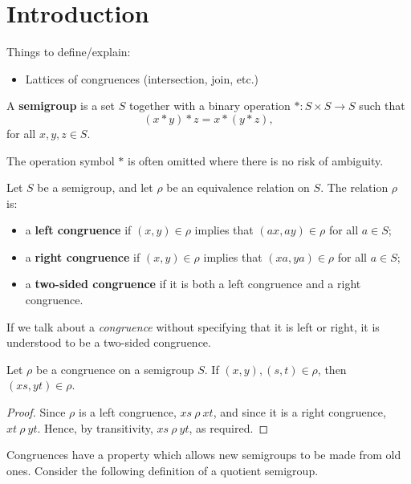 \chapter{Introduction}
\label{chap:intro}

Things to define/explain:

\begin{itemize}
\item Lattices of congruences (intersection, join, etc.)
\end{itemize}

\begin{definition}
  \label{def:semigroup}
  A \textbf{semigroup} is a set $S$ together with
  a binary operation $*: S \times S \to S$ such that
  $$(x * y) * z = x * (y * z),$$
  for all $x, y, z \in S$.
\end{definition}
The operation symbol $*$ is often omitted where there is no risk of ambiguity.

\begin{definition}
  \label{def:congruence}
  Let $S$ be a semigroup, and let $\rho$ be an equivalence relation on $S$.  The
  relation $\rho$ is:
  \begin{itemize}
  \item a \textbf{left congruence} if $(x, y) \in \rho$ implies that
    $(ax, ay) \in \rho$ for all $a \in S$;
  \item a \textbf{right congruence} if $(x, y) \in \rho$ implies that
    $(xa, ya) \in \rho$ for all $a \in S$;
  \item a \textbf{two-sided congruence} if it is both a left congruence and a
    right congruence.
  \end{itemize}
\end{definition}

If we talk about a \textit{congruence} without specifying that it is left or
right, it is understood to be a two-sided congruence.

\begin{proposition}
  \label{prop:cong-def}
  Let $\rho$ be a congruence on a semigroup $S$.  If $(x, y), (s, t) \in \rho$,
  then $(xs, yt) \in \rho$.
  \begin{proof}
    Since $\rho$ is a left congruence, $xs ~\rho~ xt$, and since it is a right
    congruence, $xt ~\rho~ yt$.  Hence, by transitivity, $xs ~\rho~ yt$, as
    required.
  \end{proof}
\end{proposition}

Congruences have a property which allows new semigroups to be made from old
ones.  Consider the following definition of a quotient semigroup.

